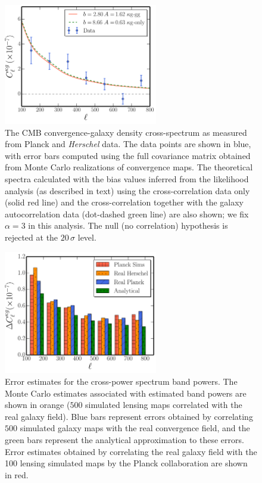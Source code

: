 \begin{figure}%
\centering %
\includegraphics[width=0.6\textwidth]{Chapter3/Images/f9}
\caption{The \gls{CMB} convergence-galaxy density cross-spectrum as measured from Planck and \textit{Herschel} data. The data points are shown in blue, with error bars computed using the full covariance matrix obtained from Monte Carlo realizations of convergence maps. The theoretical spectra calculated with the bias values inferred from the likelihood analysis (as described in text) using the cross-correlation data only (solid red line) and the cross-correlation together with the galaxy autocorrelation data (dot-dashed green line) are also shown; we fix $\alpha=3$ in this analysis. The null (no correlation) hypothesis is rejected at the $20\,\sigma$ level.  \label{fig:kg_all_mag}}
\end{figure}


\begin{figure} %
\centering %
\includegraphics[width=0.6\textwidth]{Chapter3/Images/f10}
\caption{Error estimates for the cross-power spectrum band powers. The Monte Carlo estimates associated with estimated band powers are shown in orange ($500$ simulated lensing maps correlated with the real galaxy field).  Blue bars represent errors obtained by correlating $500$ simulated galaxy maps  with the real convergence field, and the green bars represent the analytical approximation to these errors. Error estimates obtained by correlating the real galaxy field with the 100 lensing simulated maps by the Planck collaboration are shown in red. \label{fig:kg_errors}}
\end{figure}



